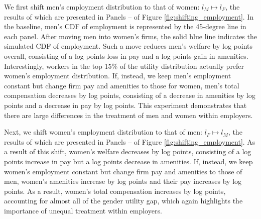 We first shift men's employment distribution to that of women: $l_{M} \mapsto l_{F}$, the results of which are presented in Panels -- of Figure \ref{fig:shifting_employment}. In the baseline, men's CDF of employment is represented by the 45-degree line in each panel. After moving men into women's firms, the solid blue line indicates the simulated CDF of employment. Such a move reduces men's welfare by  log points overall, consisting of a  log points loss in pay and a  log points gain in amenities. Interestingly, workers in the top 15\% of the utility distribution actually prefer women's employment distribution. %
%
If, instead, we keep men's employment constant but change firm pay and amenities to those for women, men's total compensation decreases by  log points, consisting of a decrease in amenities by  log points and a decrease in pay by  log points. This experiment demonstrates that there are large differences in the treatment of men and women within employers.

Next, we shift women's employment distribution to that of men: $l_{F} \mapsto l_{M}$, the results of which are presented in Panels -- of Figure \ref{fig:shifting_employment}. As a result of this shift, women's welfare decreases by  log points, consisting of a  log points increase in pay but a  log points decrease in amenities. %
%
If, instead, we keep women's employment constant but change firm pay and amenities to those of men, women's amenities increase by  log points and their pay increases by  log points. As a result, women's total compensation increases by  log points, accounting for almost all of the gender utility gap, which again highlights the importance of unequal treatment within employers.

